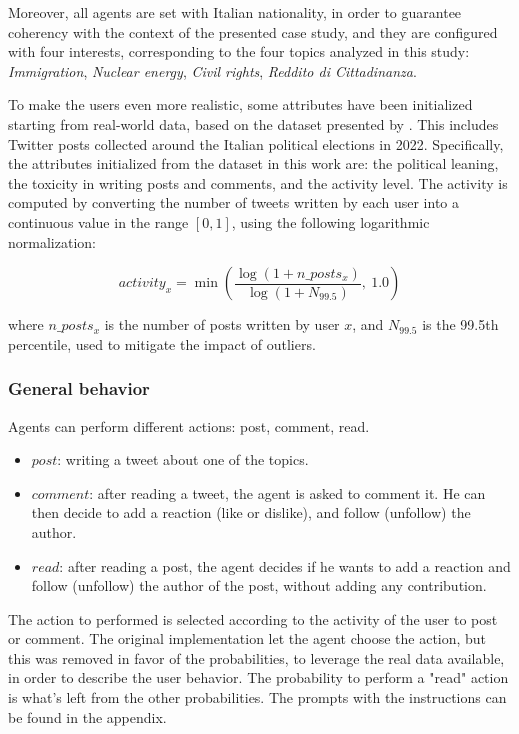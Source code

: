 Moreover, all agents are set with Italian nationality, in order to guarantee coherency with the context of the presented case study, and they are configured with four interests, corresponding to the four topics analyzed in this study: \textit{Immigration}, \textit{Nuclear energy}, \textit{Civil rights}, \textit{Reddito di Cittadinanza}.

\medskip
To make the users even more realistic, some attributes have been initialized starting from real-world data, based on the dataset presented by \citet{pierri2023ita}. This includes Twitter posts collected around the Italian political elections in 2022.
Specifically, the attributes initialized from the dataset in this work are: the political leaning, the toxicity in writing posts and comments, and the activity level.
The activity is computed by converting the number of tweets written by each user into a continuous value in the range $[0,1]$, using the following logarithmic normalization:

\[
activity_x = \min\left( \frac{\log(1 + n\_posts_x)}{\log(1 + N_{99.5})},\ 1.0 \right)
\]

where $n\_posts_x$ is the number of posts written by user $x$, and $N_{99.5}$ is the 99.5th percentile, used to mitigate the impact of outliers.


\subsubsection{General behavior}
Agents can perform different actions: post, comment, read.
\begin{itemize}
    \item $post$: writing a tweet about one of the topics.
    \item $comment$: after reading a tweet, the agent is asked to comment it. He can then decide to add a reaction (like or dislike), and follow (unfollow) the author.
    \item $read$: after reading a post, the agent decides if he wants to add a reaction and follow (unfollow) the author of the post, without adding any contribution.
\end{itemize}

The action to performed is selected according to the activity of the user to post or comment. 
The original implementation let the agent choose the action, but this was removed in favor of the probabilities, to leverage the real data available, in order to describe the user behavior.
The probability to perform a "read" action is what's left from the other probabilities.
The prompts with the instructions can be found in the appendix.

